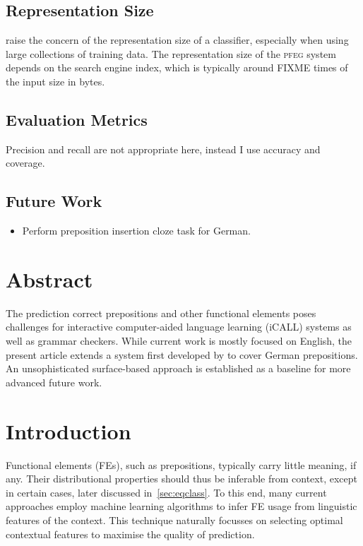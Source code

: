 \documentclass[12pt]{article}
\newcommand{\pfeg}{\textsc{pfeg}}
\begin{document}
\subsection{Representation Size}

\citet{bankobrill2001} raise the concern of the representation size of a
classifier, especially when using large collections of training data. The
representation size of the \pfeg{} system depends on the search engine index,
which is typically around FIXME times of the input size in bytes.

\subsection{Evaluation Metrics}

Precision and recall are not appropriate here, instead I use accuracy and
coverage. %

\subsection{Future Work}
\begin{itemize}
  \item Perform preposition insertion cloze task for German.
\end{itemize}

\section{Abstract}

The prediction correct prepositions and other functional elements poses challenges
for interactive computer-aided language learning (iCALL) systems as well as
grammar checkers. While current work is mostly focused on English, the present
article extends a system first developed by \citep{elghafariETAL2010} to cover
German prepositions. An unsophisticated surface-based approach is established as
a baseline for more advanced future work.

\section{Introduction}

Functional elements (FEs), such as prepositions, typically carry little meaning, if
any. Their distributional properties should thus be inferable from context,
except in certain cases, later discussed in~\ref{sec:eqclass}.
To this end, many current approaches employ machine learning algorithms to infer
FE usage from linguistic features of the context. This technique naturally
focusses on selecting optimal contextual features to maximise the quality of
prediction.
\end{document}
